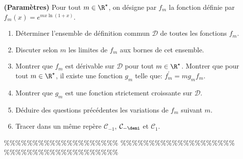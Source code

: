 



\begin{exercice}  \;
\textbf{(Param\`etres)}
Pour tout $m\in\R^{\star}$, on d\'esigne par $f_m$ la fonction d\'efinie par $f_m(x)=e^{mx\ln{(1+x)}}$.
\begin{enumerate}
\item D\'eterminer l'ensemble de d\'efinition commun $\mathcal{D}$ de toutes les fonctions $f_m$.
\item Discuter selon $m$ les limites de $f_m$ aux bornes de cet ensemble.
\item Montrer que $f_m$ est d\'erivable sur $\mathcal{D}$ pour tout $m\in\R^{\star}$. Montrer que pour tout $m\in\R^{\star}$, il existe une fonction $g_m$ telle que: $f^{\prime}_m=mg_mf_m$.
\item Montrer que $g_m$ est une fonction strictement croissante sur $\mathcal{D}$.
\item D\'eduire des questions pr\'ec\'edentes les variations de $f_m$ suivant $m$.
\item Tracer dans un m\^{e}me rep\`{e}re $\mathcal{C}_{-1}$, $\mathcal{C}_{-\demi}$ et $\mathcal{C}_{1}$.
\end{enumerate}
\end{exercice}


\%\%\%\%\%\%\%\%\%\%\%\%\%\%\%\%\%\%\%\%
\%\%\%\%\%\%\%\%\%\%\%\%\%\%\%\%\%\%\%\%
\%\%\%\%\%\%\%\%\%\%\%\%\%\%\%\%\%\%\%\%



